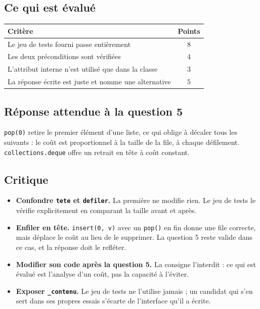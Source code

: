 \subsection*{Ce qui est évalué}

\begin{center}
\begin{tabular}{|l|c|}
\hline
\textbf{Critère} & \textbf{Points} \\
\hline
Le jeu de tests fourni passe entièrement & $8$ \\
\hline
Les deux préconditions sont vérifiées & $4$ \\
\hline
L'attribut interne n'est utilisé que dans la classe & $3$ \\
\hline
La réponse écrite est juste et nomme une alternative & $5$ \\
\hline
\end{tabular}
\end{center}

\subsection*{Réponse attendue à la question 5}

\lstinline{pop(0)} retire le premier élément d'une liste, ce qui oblige à
décaler tous les suivants : le coût est proportionnel à la taille de la file, à
chaque défilement. \lstinline{collections.deque} offre un retrait en tête à coût
constant.

\subsection*{Critique}

\begin{itemize}
  \item \textbf{Confondre \lstinline{tete} et \lstinline{defiler}.} La première
    ne modifie rien. Le jeu de tests le vérifie explicitement en comparant la
    taille avant et après.
  \item \textbf{Enfiler en tête.} \lstinline{insert(0, v)} avec un
    \lstinline{pop()} en fin donne une file correcte, mais déplace le coût au
    lieu de le supprimer. La question 5 reste valide dans ce cas, et la réponse
    doit le refléter.
  \item \textbf{Modifier son code après la question 5.} La consigne l'interdit :
    ce qui est évalué est l'analyse d'un coût, pas la capacité à l'éviter.
  \item \textbf{Exposer \lstinline{_contenu}.} Le jeu de tests ne l'utilise
    jamais ; un candidat qui s'en sert dans ses propres essais s'écarte de
    l'interface qu'il a écrite.
\end{itemize}


